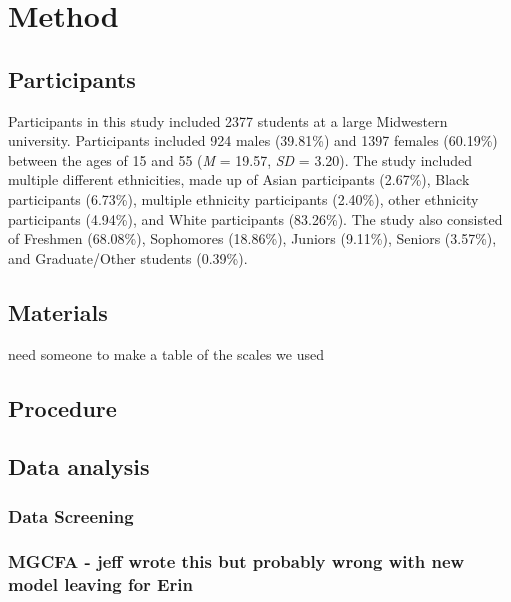 \documentclass[man,draftall]{apa6}
\begin{document}
\hypertarget{method}{%
\section{Method}\label{method}}

\hypertarget{participants}{%
\subsection{Participants}\label{participants}}

Participants in this study included 2377 students at a large Midwestern university. Participants included 924 males (39.81\%) and 1397 females (60.19\%) between the ages of 15 and 55 (\emph{M} = 19.57, \emph{SD} = 3.20). The study included multiple different ethnicities, made up of Asian participants (2.67\%), Black participants (6.73\%), multiple ethnicity participants (2.40\%), other ethnicity participants (4.94\%), and White participants (83.26\%). The study also consisted of Freshmen (68.08\%), Sophomores (18.86\%), Juniors (9.11\%), Seniors (3.57\%), and Graduate/Other students (0.39\%).

\hypertarget{materials}{%
\subsection{Materials}\label{materials}}

need someone to make a table of the scales we used

\hypertarget{procedure}{%
\subsection{Procedure}\label{procedure}}

\hypertarget{data-analysis}{%
\subsection{Data analysis}\label{data-analysis}}

\hypertarget{data-screening}{%
\subsubsection{Data Screening}\label{data-screening}}

\hypertarget{mgcfa---jeff-wrote-this-but-probably-wrong-with-new-model-leaving-for-erin}{%
\subsubsection{MGCFA - jeff wrote this but probably wrong with new model leaving for Erin}\label{mgcfa---jeff-wrote-this-but-probably-wrong-with-new-model-leaving-for-erin}}
\end{document}
